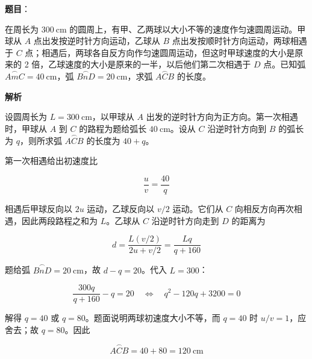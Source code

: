 \begin{answer}

\textbf{题目}：

在周长为 $300\ \mathrm{cm}$ 的圆周上，有甲、乙两球以大小不等的速度作匀速圆周运动。甲球从 $A$ 点出发按逆时针方向运动，乙球从 $B$ 点出发按顺时针方向运动，两球相遇于 $C$ 点；相遇后，两球各自反方向作匀速圆周运动，但这时甲球速度的大小是原来的 2 倍，乙球速度的大小是原来的一半，以后他们第二次相遇于 $D$ 点。已知弧 $\overset{\frown}{AmC}=40\ \mathrm{cm}$，弧 $\overset{\frown}{BnD}=20\ \mathrm{cm}$，求弧 $\overset{\frown}{ACB}$ 的长度。

\textbf{解析}

设圆周长为 $L=300\ \mathrm{cm}$，以甲球从 $A$ 出发的逆时针方向为正方向。第一次相遇时，甲球从 $A$ 到 $C$ 的路程为题给弧长 $40\ \mathrm{cm}$。设从 $C$ 沿逆时针方向到 $B$ 的弧长为 $q$，则所求弧 $\overset{\frown}{ACB}$ 的长度为 $40+q$。

第一次相遇给出初速度比

\nopagebreak[4]
\[
\frac{u}{v}=\frac{40}{q}
\]

相遇后甲球反向以 $2u$ 运动，乙球反向以 $v/2$ 运动。它们从 $C$ 向相反方向再次相遇，因此两段路程之和为 $L$。乙球从 $C$ 沿逆时针方向走到 $D$ 的距离为

\nopagebreak[4]
\[
d=\frac{L(v/2)}{2u+v/2}=\frac{Lq}{q+160}
\]

题给弧 $\overset{\frown}{BnD}=20\ \mathrm{cm}$，故 $d-q=20$。代入 $L=300$：

\nopagebreak[4]
\[
\frac{300q}{q+160}-q=20
\quad\Longleftrightarrow\quad
q^2-120q+3200=0
\]

解得 $q=40$ 或 $q=80$。题面说明两球初速度大小不等，而 $q=40$ 时 $u/v=1$，应舍去；故 $q=80$。因此

\nopagebreak[4]
\[
\overset{\frown}{ACB}=40+80=120\ \mathrm{cm}
\]


\end{answer}
